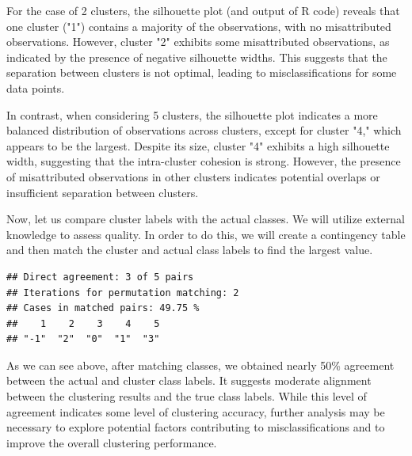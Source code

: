\documentclass[11pt,a4paper]{article}\usepackage[]{graphicx}\usepackage[]{xcolor}
\makeatletter
\newenvironment{kframe}{%
 \def\at@end@of@kframe{}%
 \ifinner\ifhmode%
  \def\at@end@of@kframe{\end{minipage}}%
  \begin{minipage}{\columnwidth}%
 \fi\fi%
 \def\FrameCommand##1{\hskip\@totalleftmargin \hskip-\fboxsep
 \colorbox{shadecolor}{##1}\hskip-\fboxsep
     \hskip-\linewidth \hskip-\@totalleftmargin \hskip\columnwidth}%
 \MakeFramed {\advance\hsize-\width
   \@totalleftmargin\z@ \linewidth\hsize
   \@setminipage}}%
 {\par\unskip\endMakeFramed%
 \at@end@of@kframe}
\newenvironment{knitrout}{}{} %
\makeatother
\begin{document}
	For the case of 2 clusters, the silhouette plot (and output of R code) reveals that one cluster ("1") contains a majority of the observations, with no misattributed observations. However, cluster "2" exhibits some misattributed observations, as indicated by the presence of negative silhouette widths. This suggests that the separation between clusters is not optimal, leading to misclassifications for some data points.
	

In contrast, when considering 5 clusters, the silhouette plot indicates a more balanced distribution of observations across clusters, except for cluster "4," which appears to be the largest. Despite its size, cluster "4" exhibits a high silhouette width, suggesting that the intra-cluster cohesion is strong. However, the presence of misattributed observations in other clusters indicates potential overlaps or insufficient separation between clusters.
	
Now, let us compare cluster labels with the actual classes. We will utilize external knowledge to assess quality. In order to do this, we will create a contingency table and then match the cluster and actual class labels to find the largest value.
	
\begin{knitrout}
\color{fgcolor}\begin{kframe}
\begin{verbatim}
## Direct agreement: 3 of 5 pairs
## Iterations for permutation matching: 2 
## Cases in matched pairs: 49.75 %
##    1    2    3    4    5 
## "-1"  "2"  "0"  "1"  "3"
\end{verbatim}
\end{kframe}
\end{knitrout}
	
As we can see above, after matching classes, we obtained nearly 50\% agreement between the actual and cluster class labels. It suggests moderate alignment between the clustering results and the true class labels. While this level of agreement indicates some level of clustering accuracy, further analysis may be necessary to explore potential factors contributing to misclassifications and to improve the overall clustering performance. 
	
\end{document}

